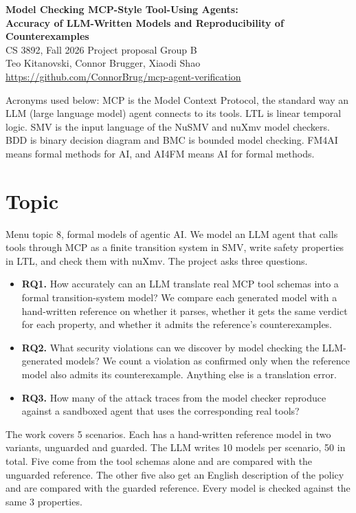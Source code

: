 \documentclass[10pt]{article}
\newcommand{\groupletter}{B}
\newcommand{\memberA}{Teo Kitanovski}
\newcommand{\memberB}{Connor Brugger}
\newcommand{\memberC}{Xiaodi Shao}
\begin{document}
\begin{center}
{\large\bfseries Model Checking MCP-Style Tool-Using Agents:\\
Accuracy of LLM-Written Models and Reproducibility of Counterexamples}\\[0.6ex]
CS 3892, Fall 2026 \quad Project proposal \quad Group \groupletter\\
\memberA, \memberB, \memberC\\
\url{https://github.com/ConnorBrug/mcp-agent-verification}
\end{center}

Acronyms used below: MCP is the Model Context Protocol, the standard way an LLM (large language
model) agent connects to its tools. LTL is linear temporal logic. SMV is the input language of the
NuSMV and nuXmv model checkers. BDD is binary decision diagram and BMC is bounded model checking.
FM4AI means formal methods for AI, and AI4FM means AI for formal methods.

\section{Topic}
Menu topic 8, formal models of agentic AI. We model an LLM agent that calls tools through MCP as a
finite transition system in SMV, write safety properties in LTL, and check them with nuXmv. The
project asks three questions.
\begin{itemize}
\item \textbf{RQ1.} How accurately can an LLM translate real MCP tool schemas into a formal
  transition-system model? We compare each generated model with a hand-written reference on whether
  it parses, whether it gets the same verdict for each property, and whether it admits the
  reference's counterexamples.
\item \textbf{RQ2.} What security violations can we discover by model checking the LLM-generated
  models? We count a violation as confirmed only when the reference model also admits its
  counterexample. Anything else is a translation error.
\item \textbf{RQ3.} How many of the attack traces from the model checker reproduce against a
  sandboxed agent that uses the corresponding real tools?
\end{itemize}
The work covers 5 scenarios. Each has a hand-written reference model in two variants, unguarded and
guarded. The LLM writes 10 models per scenario, 50 in total. Five come from the tool schemas alone
and are compared with the unguarded reference. The other five also get an English description of the
policy and are compared with the guarded reference. Every model is checked against the same 3
properties.
\end{document}
